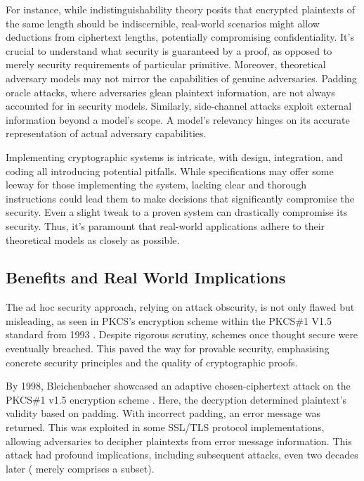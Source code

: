 \documentclass[]{final_report}
\theoremstyle{definition}
\begin{document}
For instance, while indistinguishability theory posits that encrypted plaintexts of the same length should be indiscernible, real-world scenarios might allow deductions from ciphertext lengths, potentially compromising confidentiality. It's crucial to understand what security is guaranteed by a proof, as opposed to merely security requirements of particular primitive. Moreover, theoretical adversary models may not mirror the capabilities of genuine adversaries. Padding oracle attacks, where adversaries glean plaintext information, are not always accounted for in security models. Similarly, side-channel attacks exploit external information beyond a model's scope. A model's relevancy hinges on its accurate representation of actual adversary capabilities.

Implementing cryptographic systems is intricate, with design, integration, and coding all introducing potential pitfalls. While specifications may offer some leeway for those implementing the system, lacking clear and thorough instructions could lead them to make decisions that significantly compromise the security. Even a slight tweak to a proven system can drastically compromise its security. Thus, it's paramount that real-world applications adhere to their theoretical models as closely as possible.


\subsection{Benefits and Real World Implications}
The ad hoc security approach, relying on attack obscurity, is not only flawed but misleading, as seen in PKCS's encryption scheme within the PKCS\#1 V1.5 standard from 1993 \cite{rfc2313}. Despite rigorous scrutiny, schemes once thought secure were eventually breached. This paved the way for provable security, emphasising concrete security principles and the quality of cryptographic proofs.

By 1998, Bleichenbacher showcased an adaptive chosen-ciphertext attack on the PKCS\#1 v1.5 encryption scheme \cite{bleichenbacher1998chosen}. Here, the decryption determined plaintext's validity based on padding. With incorrect padding, an error message was returned. This was exploited in some SSL/TLS protocol implementations, allowing adversaries to decipher plaintexts from error message information. This attack had profound implications, including subsequent attacks, even two decades later (\cite{coppersmith1996low, coron2000new, 10.1007/978-3-540-45238-6_33, degabriele2012joint, bardou2012efficient, meyer2014revisiting, zhang2014cross, jager2015security, jager2015practical, bock2018return} merely comprises a subset).
\end{document}
